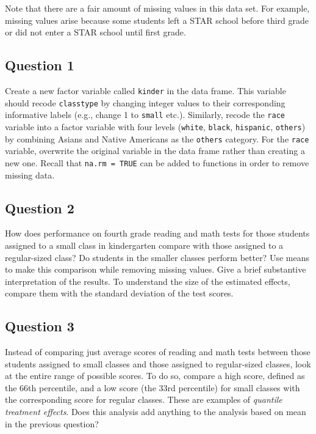 \documentclass[]{article}
\begin{document}
Note that there are a fair amount of missing values in this data set.
For example, missing values arise because some students left a STAR
school before third grade or did not enter a STAR school until first
grade.

\subsection{Question 1}\label{question-1}

Create a new factor variable called \texttt{kinder} in the data frame.
This variable should recode \texttt{classtype} by changing integer
values to their corresponding informative labels (e.g., change 1 to
\texttt{small} etc.). Similarly, recode the \texttt{race} variable into
a factor variable with four levels (\texttt{white}, \texttt{black},
\texttt{hispanic}, \texttt{others}) by combining Asians and Native
Americans as the \texttt{others} category. For the \texttt{race}
variable, overwrite the original variable in the data frame rather than
creating a new one. Recall that \texttt{na.rm = TRUE} can be added to
functions in order to remove missing data.

\subsection{Question 2}\label{question-2}

How does performance on fourth grade reading and math tests for those
students assigned to a small class in kindergarten compare with those
assigned to a regular-sized class? Do students in the smaller classes
perform better? Use means to make this comparison while removing missing
values. Give a brief substantive interpretation of the results. To
understand the size of the estimated effects, compare them with the
standard deviation of the test scores.

\subsection{Question 3}\label{question-3}

Instead of comparing just average scores of reading and math tests
between those students assigned to small classes and those assigned to
regular-sized classes, look at the entire range of possible scores. To
do so, compare a high score, defined as the 66th percentile, and a low
score (the 33rd percentile) for small classes with the corresponding
score for regular classes. These are examples of \emph{quantile
treatment effects}. Does this analysis add anything to the analysis
based on mean in the previous question?
\end{document}
